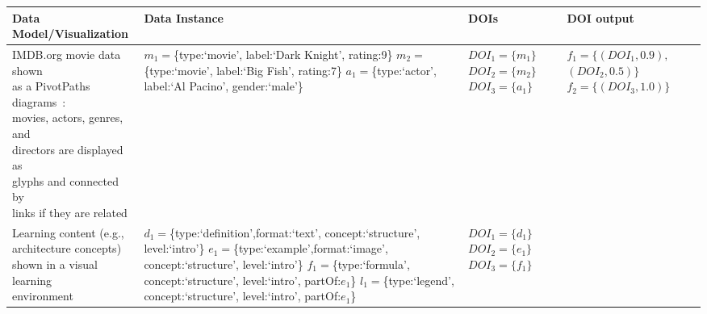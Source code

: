 \begin{table}[htbp]
	\centering
		\begin{tabular}{|l|l|l|l|}
			\hline
	Data Model/Visualization & Data Instance &DOIs& DOI output\\\hline
			\shortstack[l]{
							IMDB.org movie data shown\\as a PivotPaths\\diagrams~\cite{alam15analyzing}:\\movies, actors, genres, and\\directors are displayed as\\glyphs and connected by\\links if they are related}
		& \shortstack[l]{
							$m_1=$\{type:`movie', \\label:`Dark Knight', rating:9\} \\
							$m_2=$\{type:`movie', \\label:`Big Fish', rating:7\}\\
							$a_1=$\{type:`actor', \\label:`Al Pacino', gender:`male'\}}
		& \shortstack[l]{
									$DOI_1 = \{m_1\}$\\
									$DOI_2 = \{m_2\}$\\
									$DOI_3 = \{a_1\}$}
		&\shortstack[l]{
							$f_1=\{(DOI_1, 0.9),$\\$ (DOI_2, 0.5)\}$\\
							$f_2 = \{(DOI_3,1.0)\}$}
		\\\hline
		\shortstack[l]{
							Learning content (e.g.,\\architecture concepts)\\ shown in a visual learning\\ environment}
		& \shortstack[l]{
							$d_1=$\{type:`definition',format:`text',\\concept:`structure', level:`intro'\}\\
							$e_1=$\{type:`example',format:`image',\\concept:`structure', level:`intro'\}\\
							$f_1=$\{type:`formula',\\concept:`structure', level:`intro', partOf:$e_1$\}\\
							$l_1=$\{type:`legend',\\concept:`structure', level:`intro', partOf:$e_1$\}}					
		& \shortstack[l]{
							$DOI_1 = \{d_1\}$\\
							$DOI_2 = \{e_1\}$\\
							$DOI_3 = \{f_1\}$\\
}
\end{tabular}
\end{table}
